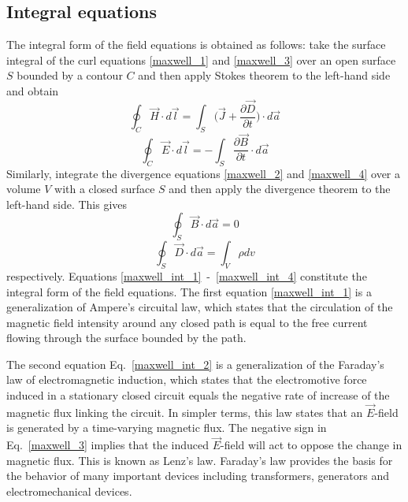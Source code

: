 \documentclass[11pt,a4paper,oneside]{book}
\numberwithin{equation}{section}
\theoremstyle{it}
\theoremstyle{definition}
\begin{document}
\subsection{Integral equations}
The integral form of the field equations is obtained as follows: take the surface integral of the curl equations \ref{maxwell_1} and \ref{maxwell_3} over an open surface $S$ bounded by a contour $C$ and then apply Stokes theorem to the left-hand side and obtain
 \begin{equation}\label{maxwell_int_1}
	\oint_C\vec{H}\cdot d\vec{l}=\int_S\Big(\vec{J} + \frac{\partial \vec{D}}{\partial t}\Big)\cdot d\vec{a}
\end{equation}
\begin{equation}\label{maxwell_int_2}
	\oint_{C}\vec{E}\cdot d\vec{l}=-\int_{S}\frac{\partial \vec{B}}{\partial t}\cdot d\vec{a}
\end{equation}
Similarly, integrate the divergence equations \ref{maxwell_2} and \ref{maxwell_4} over a volume $V$ with a closed surface $S$ and then apply the divergence theorem to the left-hand side. This gives
\begin{equation}\label{maxwell_int_3}
	\oint_{S}\vec{B}\cdot d\vec{a}=0
\end{equation}
\begin{equation}\label{maxwell_int_4}
	\oint_{S}\vec{D}\cdot d\vec{a}=\int_{V}\rho dv
\end{equation}
respectively. Equations \eqref{maxwell_int_1}~-~\eqref{maxwell_int_4} constitute the integral form of the field equations. The first equation \eqref{maxwell_int_1} is a generalization of Ampere's circuital law, which states that the circulation of the magnetic field intensity around any closed path is equal to the free current flowing through the surface bounded by the path.

The second equation Eq.~\eqref{maxwell_int_2} is a generalization of the Faraday's law of electromagnetic induction, which states that the electromotive force induced in a stationary closed circuit equals the negative rate of increase of the magnetic flux linking the circuit. In simpler terms, this law states that an $\vec{E}$-field is generated by a time-varying magnetic flux. The negative sign in Eq.~\eqref{maxwell_3} implies that the induced $\vec{E}$-field will act to oppose the change in magnetic flux. This is known as Lenz's law. Faraday's law provides the basis for the behavior of many important devices including transformers, generators and electromechanical devices.
\end{document}
